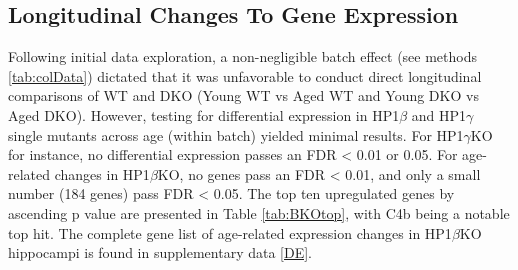 \documentclass[onehalf,12pt]{beavtex}
\begin{document}
  \subsection{Longitudinal Changes To Gene
  Expression}\label{longitudinal-changes-to-gene-expression}
  
  Following initial data exploration, a non-negligible batch effect (see
  methods \ref{tab:colData}) dictated that it was unfavorable to conduct
  direct longitudinal comparisons of WT and DKO (Young WT vs Aged WT and
  Young DKO vs Aged DKO). However, testing for differential expression in
  HP1\(\beta\) and HP1\(\gamma\) single mutants across age (within batch)
  yielded minimal results. For HP1\(\gamma\)KO for instance, no
  differential expression passes an FDR \textless{} 0.01 or 0.05. For
  age-related changes in HP1\(\beta\)KO, no genes pass an FDR \textless{}
  0.01, and only a small number (184 genes) pass FDR \textless{} 0.05. The
  top ten upregulated genes by ascending p value are presented in Table
  \ref{tab:BKOtop}, with C4b being a notable top hit. The complete gene
  list of age-related expression changes in HP1\(\beta\)KO hippocampi is
  found in supplementary data \ref{DE}.
  
  \begin{table}[t]
  
  \caption{\label{tab:BKOtop}Top 10 Upregulated Genes due to Age in HP1$\beta$KO}
  \centering
  \end{table}
  
\end{document}
